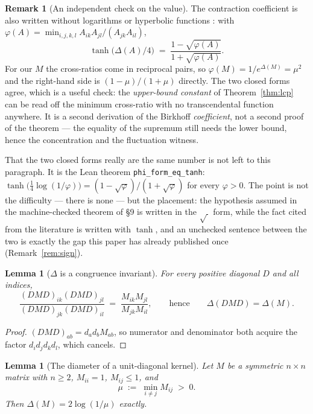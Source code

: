 \documentclass[11pt,a4paper]{article}
\theoremstyle{plain}
\newtheorem{lemma}[theorem]{Lemma}
\theoremstyle{definition}
\newtheorem{remark}[theorem]{Remark}
\begin{document}
\begin{remark}[An independent check on the value]\label{rem:phiform}
The contraction coefficient is also written without logarithms or hyperbolic
functions \cite{seneta2006}: with
$\varphi(A)=\min_{i,j,k,l} A_{ik}A_{jl}/(A_{jk}A_{il})$,
\[
  \tanh\!\big(\Delta(A)/4\big)\;=\;\frac{1-\sqrt{\varphi(A)}}{1+\sqrt{\varphi(A)}} .
\]
For our $M$ the cross-ratios come in reciprocal pairs, so
$\varphi(M)=1/e^{\Delta(M)}=\mu^{2}$ and the right-hand side is
$(1-\mu)/(1+\mu)$ directly. The two closed forms agree, which is a useful check:
the \emph{upper-bound constant} of Theorem~\ref{thm:lcp} can be read off the
minimum cross-ratio with no transcendental function anywhere. It is a second
derivation of the Birkhoff \emph{coefficient}, not a second proof of the
theorem --- the equality of the supremum still needs the lower bound, hence the
concentration and the fluctuation witness.

That the two closed forms really are the same number is not left to this
paragraph. It is the Lean theorem \verb|phi_form_eq_tanh|:
$\tanh\big(\tfrac14\log(1/\varphi)\big)=(1-\sqrt\varphi)/(1+\sqrt\varphi)$ for
every $\varphi>0$. The point is not the difficulty --- there is none --- but the
placement: the hypothesis assumed in the machine-checked theorem of \S9 is
written in the $\sqrt{\ }$ form, while the fact cited from the literature is
written with $\tanh$, and an unchecked sentence between the two is exactly the
gap this paper has already published once (Remark~\ref{rem:sign}).
\end{remark}

\begin{lemma}[$\Delta$ is a congruence invariant]\label{lem:deltainv}
For every positive diagonal $D$ and all indices,
\[
  \frac{(DMD)_{ik}(DMD)_{jl}}{(DMD)_{jk}(DMD)_{il}}
  \;=\;\frac{M_{ik}M_{jl}}{M_{jk}M_{il}},
  \qquad\text{hence}\qquad \Delta(DMD)=\Delta(M).
\]
\end{lemma}

\begin{proof}
$(DMD)_{ab}=d_ad_bM_{ab}$, so numerator and denominator both acquire the factor
$d_id_jd_kd_l$, which cancels.
\end{proof}

\begin{lemma}[The diameter of a unit-diagonal kernel]\label{lem:deltaval}
Let $M$ be a symmetric $n\times n$ matrix with $n\ge2$, $M_{ii}=1$,
$M_{ij}\le 1$, and
\[
  \mu \;:=\; \min_{i\neq j} M_{ij} \;>\;0 .
\]
Then $\Delta(M)=2\log(1/\mu)$ exactly.
\end{lemma}
\end{document}
